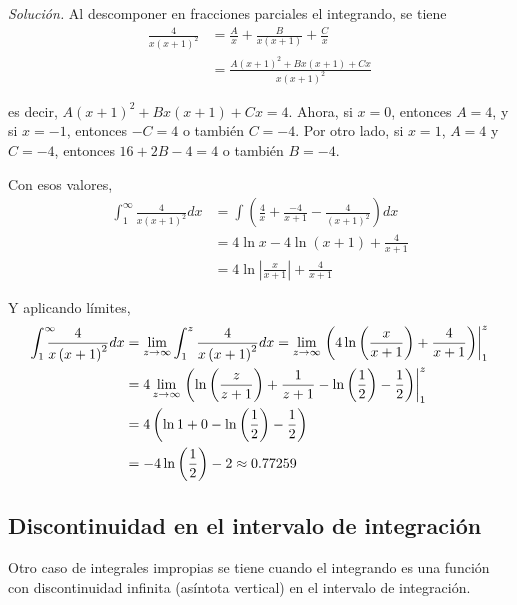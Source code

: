 \emph{Solución.} Al descomponer en fracciones parciales el integrando, se tiene
\begin{align*}
  \frac{4}{x\left( x+1\right)^{2}}&=\frac{A}{x}+\frac{B}{x\left( x+1\right) }+\frac{C}{x}\\
  &=\frac{A\left( x+1\right) ^{2}+Bx\left( x+1\right) +Cx}{x\left(x+1\right) ^{2}}
\end{align*}

es decir, $A\left( x+1\right) ^{2}+Bx\left( x+1\right) +Cx=4$. Ahora, si $x=0$, entonces $A=4$, y si $x=-1$, entonces $-C=4$ o también $C=-4$. Por otro lado, si $x=1$, $A=4$ y $C=-4$, entonces $16+2B-4=4$ o también $B=-4$.

Con esos valores,
\begin{align*}
  \int_{1}^{\infty }\frac{4}{x\left( x+1\right) ^{2}}dx&=\int \left( \frac{4}{x}+\frac{-4}{x+1}-\frac{4}{\left( x+1\right) ^{2}}\right) dx\\
  &=4\ln x-4\ln \left( x+1\right) +\frac{4}{x+1}\\
  &=4\ln \left\vert \frac{x}{x+1}\right\vert +\frac{4}{x+1}
\end{align*}

Y aplicando límites,
\begin{gather*}
  \begin{aligned}
    \int_{1}^{\infty }\hspace{-0.3cm}\frac{4}{x\left( x+1\right) ^{2}}dx&=\lim_{z\rightarrow
    \infty }\int_{1}^{z}\frac{4}{x\left( x+1\right) ^{2}}dx=\lim_{z\to
    \infty }\left.\left( 4\ln \left( \frac{x}{x+1}\right) +\frac{4}{x+1}\right)
    \right\vert_{1}^{z}\\
    &=4\lim_{z\rightarrow \infty }\left.\left( \ln \left( \frac{z}{z+1}\right) +\frac{1}{z+1}-\ln \left( \frac{1}{2}\right) -\frac{1}{2}\right)\right\vert_{1}^{z}\\
    &=4\left(\ln 1+0-\ln \left( \frac{1}{2}\right) -\frac{1}{2}\right) \\
    &=-4\ln \left( \frac{1}{2}\right) -2\approx0.77259
  \end{aligned}
\end{gather*}

\subsection{Discontinuidad en el intervalo de integración}

Otro caso de integrales impropias se tiene cuando el integrando es una función con discontinuidad infinita (asíntota vertical) en el intervalo de integración.

